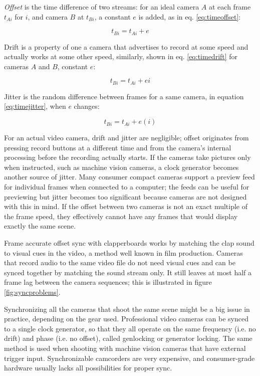 \emph{Offset} is the time difference of two streams: for an ideal camera $A$ at each frame $t_{Ai}$ for $i$, and camera $B$ at $t_{Bi}$, a constant $e$ is added, as in eq. \ref{eq:timeoffset}:

\begin{equation} \label{eq:timeoffset}
	t_{Bi} = t_{Ai} + e
\end{equation}

Drift is a property of one a camera that advertises to record at some speed and actually works at some other speed, similarly, shown in eq. \ref{eq:timedrift} for cameras $A$ and $B$, constant $e$:

\begin{equation} \label{eq:timedrift}
	t_{Bi} = t_{Ai} + e i
\end{equation}

Jitter is the random difference between frames for a same camera, in equation \ref{eq:timejitter}, when $e$ changes:

\begin{equation} \label{eq:timejitter}
	t_{Bi} = t_{Ai} + e(i)
\end{equation}

For an actual video camera, drift and jitter are negligible; offset originates from pressing record buttons at a different time and from the camera's internal processing before the recording actually starts.
If the cameras take pictures only when instructed, such as machine vision cameras, a clock generator becomes another source of jitter.
Many consumer compact cameras support a preview feed for individual frames when connected to a computer; the feeds can be useful for previewing but jitter becomes too significant because cameras are not designed with this in mind.
If the offset between two cameras is not an exact multiple of the frame speed, they effectively cannot have any frames that would display exactly the same scene.

Frame accurate offset sync with clapperboards works by matching the clap sound to visual cues in the video, a method well known in film production.
Cameras that record audio to the same video file do not need visual cues and can be synced together by matching the sound stream only.
It still leaves at most half a frame lag between the camera sequences; this is illustrated in figure \ref{fig:syncproblems}.

Synchronizing all the cameras that shoot the same scene might be a big issue in practice, depending on the gear used.
Professional video cameras can be synced to a single clock generator, so that they all operate on the same frequency (i.e. no drift) and phase (i.e. no offset), called genlocking or generator locking.
The same method is used when shooting with machine vision cameras that have external trigger input.
Synchronizable camcorders are very expensive, and consumer-grade hardware usually lacks all possibilities for proper sync.

